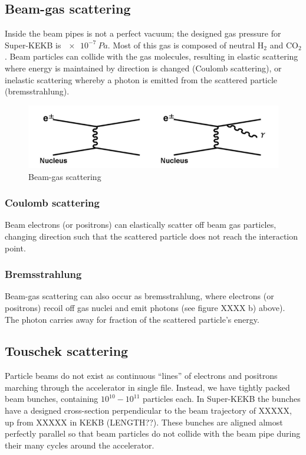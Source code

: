 \documentclass[12pt]{thesis}  %
\begin{document}
\subsection{Beam-gas scattering}	

Inside the beam pipes is not a perfect vacuum; the designed gas pressure for Super-KEKB is $\SI{e-7}{Pa}$. Most of this gas is composed of neutral H$_2$ and CO$_2$. Beam particles can collide with the gas molecules, resulting in elastic scattering where energy is maintained by direction is changed (Coulomb scattering), or inelastic scattering whereby a photon is emitted from the scattered particle (bremsstrahlung).

\begin{figure}[h]
\centering
\includegraphics[width=\linewidth]{images/beam-gas-scattering.png}
\caption{Beam-gas scattering}
\label{fig:test2}
\end{figure}


\subsubsection{Coulomb scattering}

Beam electrons (or positrons) can elastically scatter off beam gas particles, changing direction such that the scattered particle does not reach the interaction point.

\subsubsection{Bremsstrahlung}

Beam-gas scattering can also occur as bremsstrahlung, where electrons (or positrons) recoil off gas nuclei and emit photons (see figure XXXX b) above). The photon carries away for fraction of the scattered particle's energy.


\subsection{Touschek scattering}

Particle beams do not exist as continuous ``lines'' of electrons and positrons marching through the accelerator in single file. Instead, we have tightly packed beam bunches, containing $10^{10} - 10^{11}$ particles each. In Super-KEKB the bunches have a designed cross-section perpendicular to the beam trajectory of XXXXX, up from XXXXX in KEKB (LENGTH??). These bunches are aligned almost perfectly parallel so that beam particles do not collide with the beam pipe during their many cycles around the accelerator.
\end{document}
